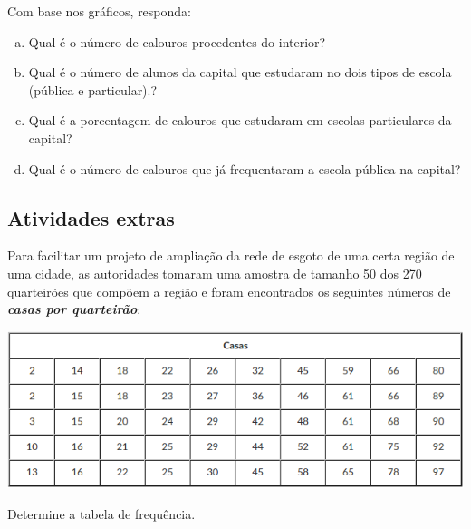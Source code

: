 	Com base nos gráficos, responda:
	\begin{enumerate}[a)]
		\item Qual é o número de calouros procedentes do interior?
		\item Qual é o número de alunos da capital que estudaram no dois tipos de escola (pública e particular).?
		\item Qual é a porcentagem de calouros que estudaram em escolas particulares da capital?
		\item Qual é o número de calouros que já frequentaram a escola pública na capital?
	\end{enumerate}


\subsection{Atividades extras}

	\item Para facilitar um projeto de ampliação da rede de esgoto de uma certa região de uma cidade, as autoridades tomaram uma amostra de tamanho 50 dos 270 quarteirões que compõem a região e foram encontrados os seguintes números de \textit{\textbf{casas por quarteirão}}:
	\begin{center}
	\includegraphics[scale=0.7]{figuras/fig115.png}
	\end{center}
	
	Determine a tabela de frequência.
	
